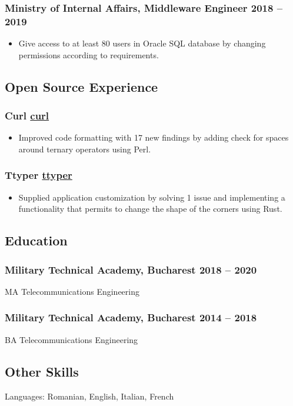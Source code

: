 \documentclass[a4paper,12pt]{article}
\begin{document}
\subsubsection*{\textbf{Ministry of Internal Affairs}, Middleware Engineer \hfill 2018 -- 2019}
\label{sec:org671d51f}
\begin{itemize}
\item Give access to at least 80 users in Oracle SQL database by changing permissions according
to requirements.
\end{itemize}
\subsection*{\textbf{Open Source Experience}}
\label{sec:orgfe11dae}
\subsubsection*{\textbf{Curl} \hfill \href{https://github.com/curl/curl}{curl}}
\label{sec:orgc0300a5}
\begin{itemize}
\item Improved code formatting with 17 new findings by adding check
for spaces around ternary operators using Perl.
\end{itemize}
\subsubsection*{\textbf{Ttyper} \hfill \href{https://github.com/maxniederman/ttyper}{ttyper}}
\label{sec:org44dec82}
\begin{itemize}
\item Supplied application customization by solving 1 issue and implementing a functionality
that permits to change the shape of the corners using Rust.
\end{itemize}
\subsection*{\textbf{Education}}
\label{sec:org626f6e2}
\subsubsection*{\textbf{Military Technical Academy}, Bucharest \hfill 2018 -- 2020}
\label{sec:orga06874b}
MA Telecommunications Engineering
\subsubsection*{\textbf{Military Technical Academy}, Bucharest \hfill 2014 -- 2018}
\label{sec:org8c9083d}
BA Telecommunications Engineering
\subsection*{\textbf{Other Skills}}
\label{sec:org84d6024}
Languages: Romanian, English, Italian, French
\end{document}
